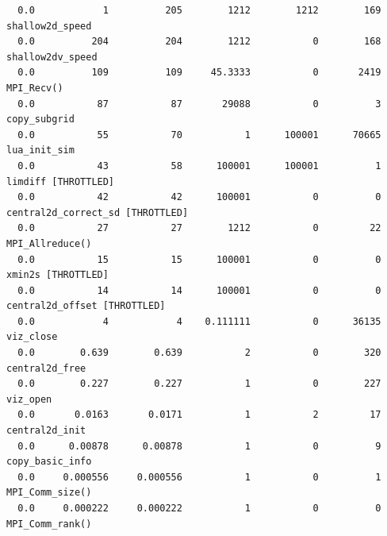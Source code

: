 \documentclass{article}
\begin{document}
{\begin{verbatim}
  0.0            1          205        1212        1212        169 shallow2d_speed 
  0.0          204          204        1212           0        168 shallow2dv_speed 
  0.0          109          109     45.3333           0       2419 MPI_Recv() 
  0.0           87           87       29088           0          3 copy_subgrid 
  0.0           55           70           1      100001      70665 lua_init_sim 
  0.0           43           58      100001      100001          1 limdiff [THROTTLED]
  0.0           42           42      100001           0          0 central2d_correct_sd [THROTTLED]
  0.0           27           27        1212           0         22 MPI_Allreduce() 
  0.0           15           15      100001           0          0 xmin2s [THROTTLED]
  0.0           14           14      100001           0          0 central2d_offset [THROTTLED]
  0.0            4            4    0.111111           0      36135 viz_close 
  0.0        0.639        0.639           2           0        320 central2d_free 
  0.0        0.227        0.227           1           0        227 viz_open 
  0.0       0.0163       0.0171           1           2         17 central2d_init 
  0.0      0.00878      0.00878           1           0          9 copy_basic_info 
  0.0     0.000556     0.000556           1           0          1 MPI_Comm_size() 
  0.0     0.000222     0.000222           1           0          0 MPI_Comm_rank() 
\end{verbatim}
}
\end{document}
